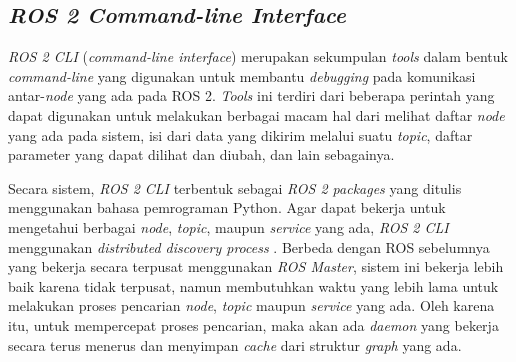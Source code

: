 \subsection{\emph{ROS 2 Command-line Interface}}
\label{subsec:ros2cli}

\emph{ROS 2 CLI} (\emph{command-line interface}) merupakan sekumpulan \emph{tools} dalam bentuk \emph{command-line} yang digunakan untuk membantu \emph{debugging} pada komunikasi antar-\emph{node} yang ada pada ROS 2.
\emph{Tools} ini terdiri dari beberapa perintah yang dapat digunakan untuk melakukan berbagai macam hal dari melihat daftar \emph{node} yang ada pada sistem,
  isi dari data yang dikirim melalui suatu \emph{topic},
  daftar parameter yang dapat dilihat dan diubah,
  dan lain sebagainya.

Secara sistem, \emph{ROS 2 CLI} terbentuk sebagai \emph{ROS 2 packages} yang ditulis menggunakan bahasa pemrograman Python.
Agar dapat bekerja untuk mengetahui berbagai \emph{node}, \emph{topic}, maupun \emph{service} yang ada,
  \emph{ROS 2 CLI} menggunakan \emph{distributed discovery process} \citep{url:ros2cliintrospection}.
Berbeda dengan ROS sebelumnya yang bekerja secara terpusat menggunakan \emph{ROS Master},
  sistem ini bekerja lebih baik karena tidak terpusat,
  namun membutuhkan waktu yang lebih lama untuk melakukan proses pencarian \emph{node}, \emph{topic} maupun \emph{service} yang ada.
Oleh karena itu, untuk mempercepat proses pencarian,
  maka akan ada \emph{daemon} yang bekerja secara terus menerus dan menyimpan \emph{cache} dari struktur \emph{graph} yang ada.
